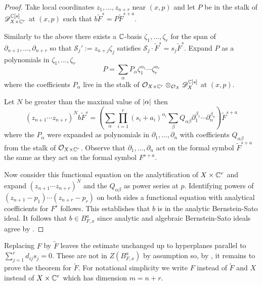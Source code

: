   \begin{proof}
    Take local coordinates $z_1,\ldots, z_{n+r}$ near $(x, p)$ and let $P$ be in the stalk of $\mathscr{D}_{X\times \mathbb{C}^r}^{\mathbb{C}[s]}$ at $(x ,p)$ such that $b \widetilde{F}^s = P \widetilde{F}^{s+a}$.

    Similarly to the above there exists a $\mathbb{C}$-basis $\zeta_1,\ldots,\zeta_r$ for the span of $\partial_{n+1}, \ldots, \partial_{n+r}$ so that $\mathcal{S}_j' := z_{n+j}\zeta_j$ satisfies $\mathcal{S}_j \cdot \widetilde{F}^s = s_{j}\widetilde{F}^s$.
    Expand $P$ as a polynomials in $\zeta_1,\ldots,\zeta_r$
    $$P = \sum_{\alpha} P_\alpha \zeta_{1}^{\alpha_1}\cdots \zeta_{r}^{\alpha_r}$$
    where the coefficients $P_\alpha$ live in the stalk of $\mathcal{O}_{X\times \mathbb{C}^r}\otimes_{\mathcal{O}_{X}}\mathscr{D}_{X}^{\mathbb{C}[s]}$ at $(x,p)$.

    Let $N$ be greater than the maximal value of $\vert \alpha \vert$ then
    $$(z_{n+1}\cdots z_{n+r})^N b \widetilde{F}^s = \left(\sum_{\alpha} \prod_{i=1}^r (s_i + a_i)^{\alpha_i} \sum_\beta Q_{\alpha\beta} \partial_1^{\beta_1}\cdots \partial_n^{\beta_n} \right)\widetilde{F}^{s+a}$$
  where the $P_\alpha$ were expanded as polynomials in $\partial_1,\ldots,\partial_n$ with coefficients $Q_{\alpha\beta}$ from the stalk of $\mathcal{O}_{X\times \mathbb{C}^r}$.
  Observe that $\partial_1,\ldots, \partial_n$ act on the formal symbol $\widetilde{F}^{s+a}$ the same as they act on the formal symbol $F^{s+a}$.

  Now consider this functional equation on the analytification of $X\times \mathbb{C}^r$ and expand $(z_{n+1}\cdots z_{n+r})^N$ and the $Q_{\alpha\beta}$ as power series at $p$.
  Identifying powers of $(z_{n+1}-p_{1})\cdots (z_{n+r} - p_r)$ on both sides a functional equation with analytical coefficients for $F^s$ follows.
  This establishes that $b$ is in the analytic Bernstein-Sato ideal.
  It follows that $ b\in B_{F,x}^a$ since analytic and algebraic Bernstein-Sato ideals agree by \cite{brianccon2002remarques}.
  \end{proof}
  Replacing $F$ by $\widetilde{F}$ leaves the estimate unchanged up to hyperplanes parallel to $\sum_{j=1}^r d_{ij}s_j = 0$.
  These are not in $Z(B_{F,x}^a)$ by assumption so, by , it remains to prove the theorem for $\widetilde{F}$.
  For notational simplicity we write $F$ instead of $\widetilde{F}$ and $X$ instead of $X\times \mathbb{C}^r$ which has dimension $m = n + r$.
